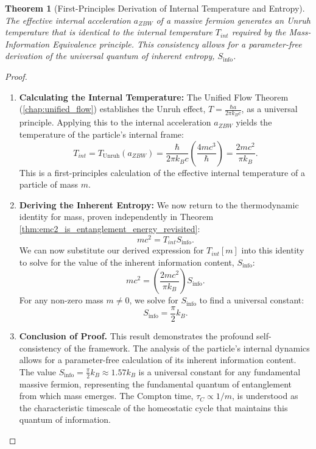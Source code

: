 \documentclass[11pt, letterpaper]{report}
\theoremstyle{plain} %
\newtheorem{theorem}{Theorem}[chapter]
\theoremstyle{definition} %
\theoremstyle{remark} %
\begin{document}
\begin{theorem}[First-Principles Derivation of Internal Temperature and Entropy]
\label{thm:internal_temp_and_entropy_final}
The effective internal acceleration $a_{ZBW}$ of a massive fermion generates an Unruh temperature that is identical to the internal temperature $T_{int}$ required by the Mass-Information Equivalence principle. This consistency allows for a parameter-free derivation of the universal quantum of inherent entropy, $S_{\text{info}}$.
\end{theorem}
\begin{proof}
\begin{enumerate}
    \item \textbf{Calculating the Internal Temperature:} The Unified Flow Theorem (\cref{chap:unified_flow}) establishes the Unruh effect, $T = \frac{\hbar a}{2\pi k_B c}$, as a universal principle. Applying this to the internal acceleration $a_{ZBW}$ yields the temperature of the particle's internal frame:
    \begin{equation}
        T_{int} = T_{\text{Unruh}}(a_{ZBW}) = \frac{\hbar}{2\pi k_B c} \left( \frac{4mc^3}{\hbar} \right) = \frac{2mc^2}{\pi k_B}.
        \label{eq:derived_internal_temp_final}
    \end{equation}
    This is a first-principles calculation of the effective internal temperature of a particle of mass $m$.

    \item \textbf{Deriving the Inherent Entropy:} We now return to the thermodynamic identity for mass, proven independently in Theorem \ref{thm:emc2_is_entanglement_energy_revisited}:
    \begin{equation}
        mc^2 = T_{int} S_{\text{info}}.
    \end{equation}
    We can now substitute our derived expression for $T_{int}[m]$ into this identity to solve for the value of the inherent information content, $S_{\text{info}}$:
    \begin{equation}
        mc^2 = \left( \frac{2mc^2}{\pi k_B} \right) S_{\text{info}}.
    \end{equation}
    For any non-zero mass $m \neq 0$, we solve for $S_{\text{info}}$ to find a universal constant:
    \begin{equation}
        \boxed{S_{\text{info}} = \frac{\pi}{2} k_B.}
        \label{eq:derived_s_info_final}
    \end{equation}

    \item \textbf{Conclusion of Proof.} This result demonstrates the profound self-consistency of the framework. The analysis of the particle's internal dynamics allows for a parameter-free calculation of its inherent information content. The value $S_{\text{info}} = \frac{\pi}{2} k_B \approx 1.57 k_B$ is a universal constant for any fundamental massive fermion, representing the fundamental quantum of entanglement from which mass emerges. The Compton time, $\tau_C \propto 1/m$, is understood as the characteristic timescale of the homeostatic cycle that maintains this quantum of information.
\end{enumerate}
\end{proof}
\end{document}
